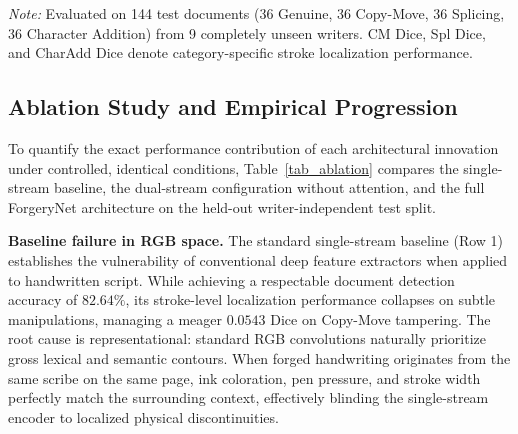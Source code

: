 \documentclass[pdflatex,sn-mathphys-num,iicol]{sn-jnl}
\begin{document}
\begin{table}[t]
\caption{Controlled component ablation on the held-out writer-independent test split (144 document patches from 9 unseen writers). All configurations are trained under identical training protocols and random seeds.}\label{tab_ablation}
\centering
\setlength{\tabcolsep}{4pt}
\vskip3pt
\footnotesize\textit{Note:} Evaluated on 144 test documents (36 Genuine, 36 Copy-Move, 36 Splicing, 36 Character Addition) from 9 completely unseen writers. CM Dice, Spl Dice, and CharAdd Dice denote category-specific stroke localization performance.
\end{table}

\subsection{Ablation Study and Empirical Progression}\label{subsec5_3}
To quantify the exact performance contribution of each architectural innovation under controlled, identical conditions, Table~\ref{tab_ablation} compares the single-stream baseline, the dual-stream configuration without attention, and the full ForgeryNet architecture on the held-out writer-independent test split.

\noindent
\textbf{Baseline failure in RGB space.} The standard single-stream baseline (Row 1) establishes the vulnerability of conventional deep feature extractors when applied to handwritten script. While achieving a respectable document detection accuracy of $82.64\%$, its stroke-level localization performance collapses on subtle manipulations, managing a meager $0.0543$ Dice on Copy-Move tampering. The root cause is representational: standard RGB convolutions naturally prioritize gross lexical and semantic contours. When forged handwriting originates from the same scribe on the same page, ink coloration, pen pressure, and stroke width perfectly match the surrounding context, effectively blinding the single-stream encoder to localized physical discontinuities.
\end{document}
